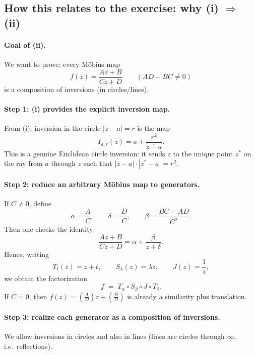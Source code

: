 \documentclass[12pt,a4paper]{article}
\theoremstyle{plain}
\theoremstyle{definition}      %
\begin{document}
	\subsection*{\textbf{How this relates to the exercise: why (i) $\Rightarrow$ (ii)}}
	
	\paragraph{\textbf{Goal of (ii).}}
	We want to prove: every Möbius map
	\[
	f(z)=\frac{Az+B}{Cz+D}\qquad(AD-BC\neq 0)
	\]
	is a composition of inversions (in circles/lines).
	
	\paragraph{\textbf{Step 1: (i) provides the explicit inversion map.}}
	From (i), inversion in the circle $|z-a|=r$ is the map
	\[
	I_{a,r}(z)=a+\frac{r^{2}}{\overline{z-a}}.
	\]
	This is a genuine Euclidean circle inversion: it sends $z$ to the unique point $z^{*}$ on the ray from $a$ through $z$
	such that $|z-a|\cdot|z^{*}-a|=r^{2}$.
	
	\paragraph{\textbf{Step 2: reduce an arbitrary Möbius map to generators.}}
	If $C\neq 0$, define
	\[
	\alpha=\frac{A}{C},\qquad
	\delta=\frac{D}{C},\qquad
	\beta=\frac{BC-AD}{C^{2}}.
	\]
	Then one checks the identity
	\[
	\frac{Az+B}{Cz+D}=\alpha+\frac{\beta}{z+\delta}.
	\]
	Hence, writing
	\[
	T_t(z)=z+t,\qquad S_\lambda(z)=\lambda z,\qquad J(z)=\frac{1}{z},
	\]
	we obtain the factorization
	\[
	f \;=\; T_{\alpha}\circ S_{\beta}\circ J\circ T_{\delta}.
	\]
	If $C=0$, then $f(z)=\left(\frac{A}{D}\right)z+\left(\frac{B}{D}\right)$ is already a similarity plus translation.
	
	\paragraph{\textbf{Step 3: realize each generator as a composition of inversions.}}
	We allow inversions in circles and also in lines (lines are circles through $\infty$, i.e.\ reflections).
	
\end{document}
